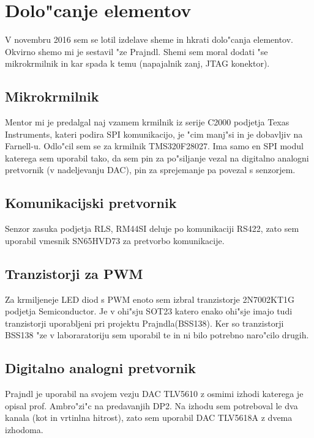 \documentclass[a4paper]{article}
\begin{document}
\section{Dolo"canje elementov}

V novembru 2016 sem se lotil izdelave sheme in hkrati dolo"canja elementov. Okvirno shemo mi je sestavil "ze Prajndl. Shemi sem moral dodati "se mikrokrmilnik in kar spada k temu (napajalnik zanj, JTAG konektor).

\subsection{Mikrokrmilnik}
Mentor mi je predalgal naj vzamem krmilnik iz serije C2000 podjetja Texas Instruments, kateri podira SPI komunikacijo, je "cim manj"si in je dobavljiv na Farnell-u. Odlo"cil sem se za krmilnik TMS320F28027. Ima samo en SPI modul katerega sem uporabil tako, da sem pin za po"siljanje vezal na digitalno analogni pretvornik (v nadeljevanju DAC), pin za sprejemanje pa povezal s senzorjem.

\subsection{Komunikacijski pretvornik}

Senzor zasuka podjetja RLS, RM44SI deluje po komunikaciji RS422, zato sem uporabil vmesnik SN65HVD73 za pretvorbo komunikacije.

\subsection{Tranzistorji za PWM}

Za krmiljeneje LED diod s PWM enoto sem izbral tranzistorje 2N7002KT1G podjetja Semiconductor. Je v ohi"sju SOT23 katero enako ohi"sje imajo tudi tranzistorji uporabljeni pri projektu Prajndla(BSS138). Ker so tranzistorji BSS138 "ze v laboraratoriju sem uporabil te in ni bilo potrebno naro"cilo drugih. 


\subsection{Digitalno analogni pretvornik}

Prajndl je uporabil na svojem vezju DAC TLV5610 z osmimi izhodi katerega je opisal prof. Ambro"zi"c na predavanjih DP2. Na izhodu sem potreboval le dva kanala (kot in vrtinlna hitrost), zato sem uporabil DAC TLV5618A z dvema izhodoma.
\end{document}
